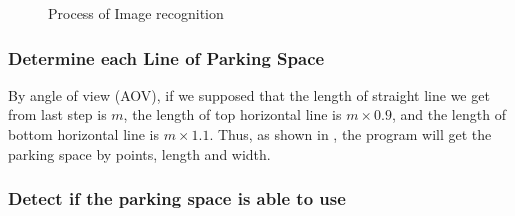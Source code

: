 \documentclass[preprint,12pt]{elsarticle}
\begin{document}
\begin{figure}[tbp]
  \centering
	\hspace{0.1in}
	\caption{Process of Image recognition}
	\label{fig:findLine}
\end{figure}

\subsubsection{Determine each Line of Parking Space}

By angle of view (AOV)\cite{AOV}, if we supposed that the length of
straight line we get from last step is $m$, the length of top horizontal
line is $m \times 0.9$, and the length of bottom horizontal line is $m \times 1.1$.
Thus, as shown in , the program will get the parking
space by points, length and width.

\subsubsection{Detect if the parking space is able to use}
\end{document}

